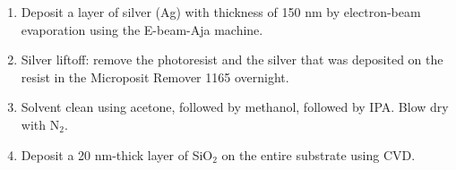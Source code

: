 \documentclass{article}
\theoremstyle{definition}
\begin{document}
\begin{enumerate}[label=(\alph*)]
\item Deposit a layer of silver (Ag) with thickness of 150 nm by electron-beam evaporation using the E-beam-Aja machine.

\item Silver liftoff: remove the photoresist and the silver that was deposited on the resist in the Microposit Remover 1165 overnight. 

\item Solvent clean using acetone, followed by methanol, followed by IPA. Blow dry with N$_2$.

\item Deposit a 20 nm-thick layer of SiO$_2$ on the entire substrate using CVD.

\end{enumerate}
\end{document}
